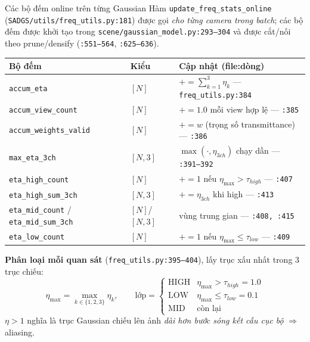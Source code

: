 \begin{frame}[fragile]{Các bộ đếm online trên từng Gaussian}
\scriptsize
Hàm \texttt{update\_freq\_stats\_online} (\texttt{SADGS/utils/freq\_utils.py:181}) được gọi \emph{cho từng camera trong batch}; các bộ đếm được khởi tạo trong \texttt{scene/gaussian\_model.py:293--304} và được cắt/nối theo prune/densify (\texttt{:551--564}, \texttt{:625--636}).

\begin{center}
\begin{tabular}{lll}
\hline
\textbf{Bộ đếm} & \textbf{Kiểu} & \textbf{Cập nhật (file:dòng)} \\
\hline
\texttt{accum\_eta} & $[N]$ & $+{=}\sum_{k=1}^{3}\eta_k$ --- \texttt{freq\_utils.py:384} \\
\texttt{accum\_view\_count} & $[N]$ & $+{=}1.0$ mỗi view hợp lệ --- \texttt{:385} \\
\texttt{accum\_weights\_valid} & $[N]$ & $+{=}w$ (trọng số transmittance) --- \texttt{:386} \\
\texttt{max\_eta\_3ch} & $[N,3]$ & $\max(\cdot,\eta_{3ch})$ chạy dần --- \texttt{:391--392} \\
\texttt{eta\_high\_count} & $[N]$ & $+{=}1$ nếu $\eta_{\max}>\tau_{high}$ --- \texttt{:407} \\
\texttt{eta\_high\_sum\_3ch} & $[N,3]$ & $+{=}\eta_{3ch}$ khi high --- \texttt{:413} \\
\texttt{eta\_mid\_count} / \texttt{eta\_mid\_sum\_3ch} & $[N]$/$[N,3]$ & vùng trung gian --- \texttt{:408, :415} \\
\texttt{eta\_low\_count} & $[N]$ & $+{=}1$ nếu $\eta_{\max}\le\tau_{low}$ --- \texttt{:409} \\
\hline
\end{tabular}
\end{center}

\textbf{Phân loại mỗi quan sát} (\texttt{freq\_utils.py:395--404}), lấy trục xấu nhất trong 3 trục chiếu:
\[
\eta_{\max}=\max_{k\in\{1,2,3\}}\eta_k,\qquad
\text{lớp}=\begin{cases}
\text{HIGH} & \eta_{\max} > \tau_{high}=1.0\\
\text{LOW} & \eta_{\max} \le \tau_{low}=0.1\\
\text{MID} & \text{còn lại}
\end{cases}
\]
$\eta>1$ nghĩa là trục Gaussian chiếu lên ảnh \emph{dài hơn bước sóng kết cấu cục bộ} $\Rightarrow$ aliasing.
\end{frame}


